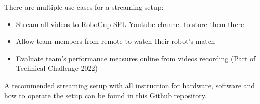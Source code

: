 There are multiple use cases for a streaming setup: 
\begin{itemize}
	\item Stream all videos to RoboCup SPL Youtube channel to store them there
	\item Allow team members from remote to watch their robot's match
	\item Evaluate team's performance measures online from videos recording (Part of Technical Challenge 2022)
\end{itemize}

A recommended streaming setup with all instruction for hardware, software and how to operate the setup can be found in this Github repository. 
